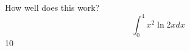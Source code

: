 \documentclass{article}
\begin{document}
How well does this work?
$$\int_0^4 x^2 \ln{2x}dx$$
10
\end{document}
